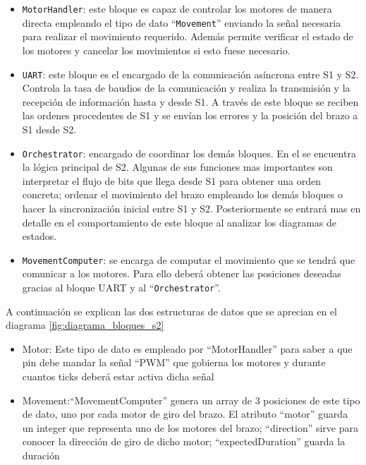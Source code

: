 \begin{itemize}
    \item \texttt{MotorHandler}: este bloque es capaz de controlar los motores de manera directa empleando el tipo de dato ``\texttt{Movement}'' enviando la señal necesaria para realizar el movimiento requerido. Además permite verificar el estado de los motores y cancelar los movimientos si esto fuese necesario.
    
    \item \texttt{UART}: este bloque es el encargado de la comunicación asíncrona entre \ac{S1} y \ac{S2}. Controla la tasa de baudios de la comunicación y realiza la transmisión y la recepción de información hasta y desde \ac{S1}. A través de este bloque se reciben las ordenes procedentes de \ac{S1} y se envían los errores y la posición del brazo a S1 desde \ac{S2}.
    
    \item \texttt{Orchestrator}: encargado de coordinar los demás bloques. En el se encuentra la lógica principal de \ac{S2}. Algunas de sus funciones mas importantes son interpretar el flujo de bits que llega desde S1 para obtener una orden concreta; ordenar el movimiento del brazo empleando los demás bloques o hacer la sincronización inicial entre \ac{S1} y  \ac{S2}. Posteriormente se entrará mas en detalle en el comportamiento de este bloque al analizar los diagramas de estados.
    
    \item \texttt{MovementComputer}: se encarga de computar el movimiento que se tendrá que comunicar a los motores. Para ello deberá obtener las posiciones deseadas gracias al bloque UART y al ``\texttt{Orchestrator}''.
\end{itemize}

A continuación se explican las dos estructuras de datos que se aprecian en el diagrama \ref{fig:diagrama_bloques_s2}

\begin{itemize}
    \item Motor: Este tipo de dato es empleado por ``MotorHandler'' para saber a que pin debe mandar la señal ``PWM'' que gobierna los motores y durante cuantos ticks deberá estar activa dicha señal
    
    \item Movement:``MovementComputer'' genera un array de 3 posiciones de este tipo de dato, uno por cada motor de giro del brazo. El atributo ``motor'' guarda un integer que representa uno de los motores del brazo; ``direction'' sirve para conocer la dirección de giro de dicho motor; ``expectedDuration'' guarda la duración  
\end{itemize}


